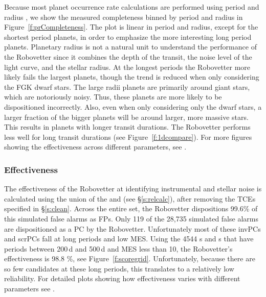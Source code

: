 Because most planet occurrence rate calculations are performed using period and radius \citep[e.g.][]{Burke2015}, we show the measured completeness binned by period and radius in Figure~\ref{f:prCompleteness}. The plot is linear in period and radius, except for the shortest period planets, in order to emphasize the more interesting long period planets. Planetary radius is not a natural unit to understand the performance of the Robovetter since it combines the depth of the transit, the noise level of the light curve, and the stellar radius.  At the longest periods the Robovetter more likely fails the largest planets, though the trend is reduced when only considering the FGK dwarf stars. The large radii planets are primarily around giant stars, which are notoriously noisy. Thus, these planets are more likely to be dispositioned incorrectly. Also, even when only considering only the dwarf stars, a larger fraction of the bigger planets will be around larger, more massive stars. This results in planets with longer transit durations. The Robovetter performs less well for long transit durations (see Figure~\ref{f:1dcompare}). For more figures showing the effectiveness across different parameters, see \citet{Coughlin2017a}.


\subsubsection{Effectiveness}
The effectiveness of the Robovetter at identifying instrumental and stellar noise is calculated using the union of the  and  (see \S\ref{s:relcalc}), after removing the TCEs specified in \S\ref{s:clean}. Across the entire set, the Robovetter dispositions 99.6\% of this simulated false alarms as FPs.  Only 119 of the 28,735 simulated false alarms are dispositioned as a PC by the Robovetter.  Unfortunately most of these invPCs and scrPCs fall at long periods and low MES. Using the 4544 \invtce s and \scrtce s that have periods between 200\,d and 500\,d and MES less than 10, the Robovetter's effectiveness is 98.8 \%, see Figure~\ref{f:scoregrid}.  Unfortunately, because there are so few candidates at these long periods, this translates to a relatively low reliability.  For detailed plots showing how effectiveness varies with different parameters see \citet{Coughlin2017a}.


